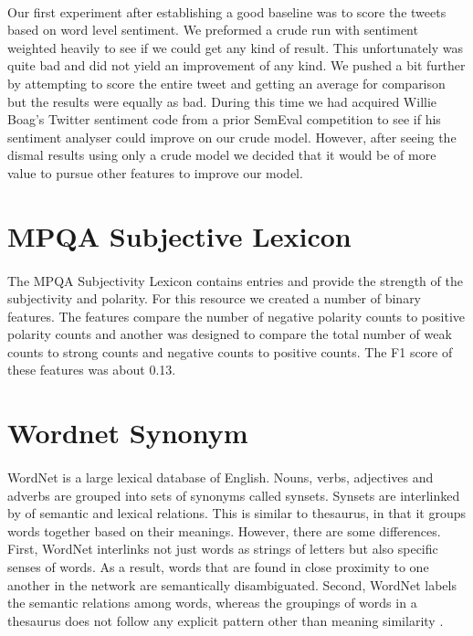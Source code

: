 \documentclass[11pt,letterpaper]{article}
\begin{document}

\paragraph{}
Our first experiment after establishing a good baseline was to score the tweets based on word level sentiment. We preformed a crude run with sentiment weighted heavily to see if we could get any kind of result. This unfortunately was quite bad and did not yield an improvement of any kind. We pushed a bit further by attempting to score the entire tweet and getting an average for comparison but the results were equally as bad. During this time we had acquired Willie Boag's Twitter sentiment code from a prior SemEval competition to see if his sentiment analyser could improve on our crude model. However, after seeing the dismal results using only a crude model we decided that it would be of more value to pursue other features to improve our model.

\section{MPQA Subjective Lexicon}
\paragraph{}
The MPQA Subjectivity Lexicon contains entries and provide the strength of the subjectivity and polarity. For this resource we created a number of binary features. The features compare the number of negative polarity counts to positive polarity counts and another was designed to compare the total number of weak counts to strong counts and negative counts to positive counts. The F1 score of these features was about 0.13.


\section{Wordnet Synonym}

\paragraph{}
WordNet is a large lexical database of English. Nouns, verbs, adjectives and adverbs are grouped into sets of synonyms called synsets. Synsets are interlinked by of semantic and lexical relations. This is similar to thesaurus, in that it groups words together based on their meanings. However, there are some differences. First, WordNet interlinks not just words as strings of letters but also specific senses of words. As a result, words that are found in close proximity to one another in the network are semantically disambiguated. Second, WordNet labels the semantic relations among words, whereas the groupings of words in a thesaurus does not follow any explicit pattern other than meaning similarity \cite{wordnet}.
\end{document}
